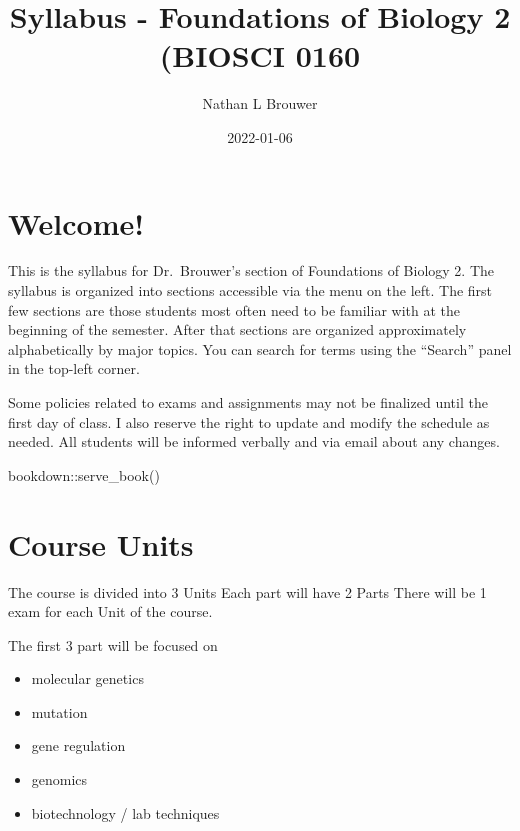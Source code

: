 \documentclass[
]{book}
\title{Syllabus - Foundations of Biology 2 (BIOSCI 0160}
\author{Nathan L Brouwer}
\date{2022-01-06}
\newenvironment{Shaded}{\begin{snugshade}}{\end{snugshade}}
\newcommand{\FunctionTok}[1]{\textcolor[rgb]{0.00,0.00,0.00}{#1}}
\newcommand{\NormalTok}[1]{#1}
\newcommand{\SpecialCharTok}[1]{\textcolor[rgb]{0.00,0.00,0.00}{#1}}
\providecommand{\tightlist}{%
  \setlength{\itemsep}{0pt}\setlength{\parskip}{0pt}}
\begin{document}
\maketitle

{
\setcounter{tocdepth}{1}
\tableofcontents
}
\hypertarget{welcome}{%
\chapter{Welcome!}\label{welcome}}

This is the syllabus for Dr.~Brouwer's section of Foundations of Biology 2. The syllabus is organized into sections accessible via the menu on the left. The first few sections are those students most often need to be familiar with at the beginning of the semester. After that sections are organized approximately alphabetically by major topics. You can search for terms using the ``Search'' panel in the top-left corner.

Some policies related to exams and assignments may not be finalized until the first day of class. I also reserve the right to update and modify the schedule as needed. All students will be informed verbally and via email about any changes.

\begin{Shaded}
\begin{Highlighting}[]
\NormalTok{bookdown}\SpecialCharTok{::}\FunctionTok{serve\_book}\NormalTok{()}
\end{Highlighting}
\end{Shaded}

\hypertarget{course-units}{%
\chapter{Course Units}\label{course-units}}

The course is divided into 3 Units Each part will have 2 Parts
There will be 1 exam for each Unit of the course.

The first 3 part will be focused on

\begin{itemize}
\tightlist
\item
  molecular genetics
\item
  mutation
\item
  gene regulation
\item
  genomics
\item
  biotechnology / lab techniques
\end{itemize}
\end{document}
